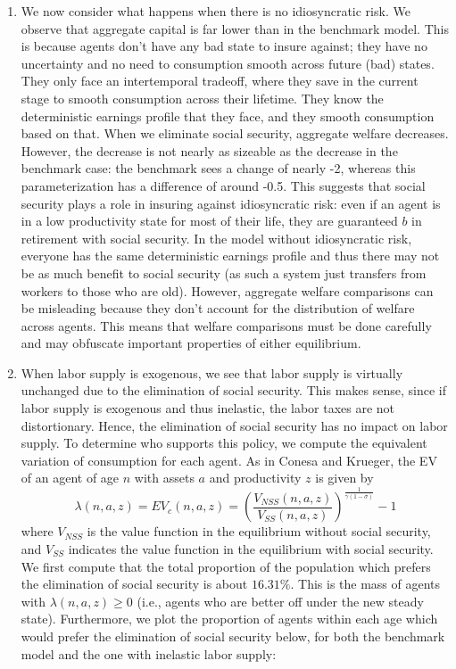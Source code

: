 \documentclass[12pt]{article}
\begin{document}
\begin{enumerate}
   \item We now consider what happens when there is no idiosyncratic risk. We observe that aggregate capital is far lower than in the benchmark model. This is because agents don't have any bad state to insure against; they have no uncertainty and no need to consumption smooth across future (bad) states. They only face an intertemporal tradeoff, where they save in the current stage to smooth consumption across their lifetime. They know the deterministic earnings profile that they face, and they smooth consumption based on that. When we eliminate social security, aggregate welfare decreases. However, the decrease is not nearly as sizeable as the decrease in the benchmark case: the benchmark sees a change of nearly -2, whereas this parameterization has a difference of around -0.5. This suggests that social security plays a role in insuring against idiosyncratic risk: even if an agent is in a low productivity state for most of their life, they are guaranteed $b$ in retirement with social security. In the model without idiosyncratic risk, everyone has the same deterministic earnings profile and thus there may not be as much benefit to social security (as such a system just transfers from workers to those who are old). However, aggregate welfare comparisons can be misleading because they don't account for the distribution of welfare across agents. This means that welfare comparisons must be done carefully and may obfuscate important properties of either equilibrium.
   \item When labor supply is exogenous, we see that labor supply is virtually unchanged due to the elimination of social security. This makes sense, since if labor supply is exogenous and thus inelastic, the labor taxes are not distortionary. Hence, the elimination of social security has no impact on labor supply. To determine who supports this policy, we compute the equivalent variation of consumption for each agent. As in Conesa and Krueger, the EV of an agent of age $n$ with assets $a$ and productivity $z$ is given by
   \[\lambda(n, a,z) = EV_c(n,a,z) = \left( \frac{V_{NSS}(n, a, z)}{V_{SS}(n, a, z)}\right)^{\frac{1}{\gamma(1-\sigma)}}-1\]
   where $V_{NSS}$ is the value function in the equilibrium without social security, and $V_{SS}$ indicates the value function in the equilibrium with social security. We first compute that the total proportion of the population which prefers the elimination of social security is about $16.31\%$. This is the mass of agents with $\lambda(n, a, z) \geq 0$ (i.e., agents who are better off under the new steady state). Furthermore, we plot the proportion of agents within each age which would prefer the elimination of social security below, for both the benchmark model and the one with inelastic labor supply:

\end{enumerate}
\end{document}
